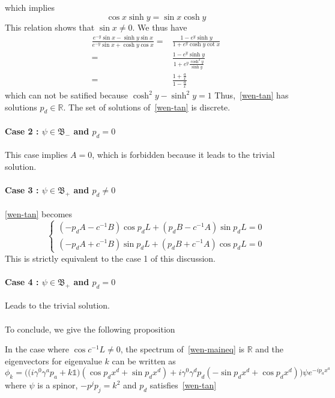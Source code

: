 which implies
\begin{equation*}
\cos x \sinh y = \sin x \cosh y
\end{equation*}
This relation shows that $\sin x \neq 0$.
We thus have
\begin{equation*}\begin{split}
\frac{e^{-y}\sin x - \sinh y \sin x}{e^{-y}\sin x + \cosh y \cos x} = &
\frac{1 - e^y \sinh y}{1+ e^y \cosh y \cot x} \\
= &\frac{1 - e^y \sinh y }{1+ e^y \frac{\cosh^2 y }{\sinh y}} \\
=& \frac{1+\frac{a}{x}}{1 - \frac{a}{x}}
\end{split}
\end{equation*}
which can not be satified because $\cosh^2 y - \sinh^2 y =1$
Thus,~\cref{wen-tan} has solutions $p_d \in \mathbb{R}$. The set of solutions of~\cref{wen-tan} is discrete.
\paragraph{Case 2 : $\psi \in \mathfrak{B}_-$ and $p_d = 0$}
This case implies $A = 0$, which is forbidden because it leads to the trivial solution.
%
\paragraph{Case 3 : $\psi \in \mathfrak{B}_+$ and $p_d \neq 0$}
\cref{wen-tan} becomes
\begin{equation*}
\begin{cases}
(-p_d A - c^{-1} B)\cos p_d L + (p_d B - c^{-1}A)\sin p_d L = 0  \\
(-p_d A + c^{-1}B)\sin p_d L + (p_d B + c^{-1} A)\cos p_d L = 0 
\end{cases}
\end{equation*}
This is strictly equivalent to the case 1 of this discussion.
%
\paragraph{Case 4 : $\psi \in \mathfrak{B}_+$ and $p_d = 0$}
Leads to the trivial solution. \\\\
To conclude, we give the following proposition
\begin{proposition}
In the case where $\cos c^{-1}L \neq 0$,
the spectrum of~\cref{wen-maineq} is $\mathbb{R}$ 
and the eigenvectors for eigenvalue $k$ can be written as 
\begin{equation*}
\phi_k = \Big(\big(i\gamma^0\gamma^a p_a+k\mathbb{1}\big)(\cos p_d x^d + \sin p_d x^d) +
i\gamma^0\gamma^d p_d(-\sin p_d x^d + \cos p_d x^d)\Big) \psi e^{-ip_a x^a}
\end{equation*}
where $\psi$ is a spinor, $-p^jp_j = k^2$ and $p_d$ satisfies~\cref{wen-tan}
\end{proposition}




